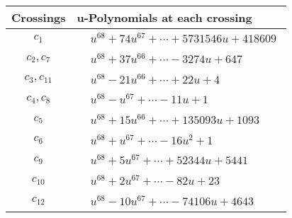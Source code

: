 \documentclass[1p]{elsarticle_modified}
\theoremstyle{definition}
\begin{document}
\begin{tabular}{m{50pt}|m{274pt}}
Crossings & \hspace{64pt}u-Polynomials at each crossing \\
\hline $$\begin{aligned}c_{1}\end{aligned}$$&$\begin{aligned}
&u^{68}+74 u^{67}+\cdots+5731546 u+418609
\end{aligned}$\\
\hline $$\begin{aligned}c_{2},c_{7}\end{aligned}$$&$\begin{aligned}
&u^{68}+37 u^{66}+\cdots-3274 u+647
\end{aligned}$\\
\hline $$\begin{aligned}c_{3},c_{11}\end{aligned}$$&$\begin{aligned}
&u^{68}-21 u^{66}+\cdots+22 u+4
\end{aligned}$\\
\hline $$\begin{aligned}c_{4},c_{8}\end{aligned}$$&$\begin{aligned}
&u^{68}- u^{67}+\cdots-11 u+1
\end{aligned}$\\
\hline $$\begin{aligned}c_{5}\end{aligned}$$&$\begin{aligned}
&u^{68}+15 u^{66}+\cdots+135093 u+1093
\end{aligned}$\\
\hline $$\begin{aligned}c_{6}\end{aligned}$$&$\begin{aligned}
&u^{68}+u^{67}+\cdots-16 u^2+1
\end{aligned}$\\
\hline $$\begin{aligned}c_{9}\end{aligned}$$&$\begin{aligned}
&u^{68}+5 u^{67}+\cdots+52344 u+5441
\end{aligned}$\\
\hline $$\begin{aligned}c_{10}\end{aligned}$$&$\begin{aligned}
&u^{68}+2 u^{67}+\cdots-82 u+23
\end{aligned}$\\
\hline $$\begin{aligned}c_{12}\end{aligned}$$&$\begin{aligned}
&u^{68}-10 u^{67}+\cdots-74106 u+4643
\end{aligned}$\\
\hline
\end{tabular}\\~\\
\end{document}
